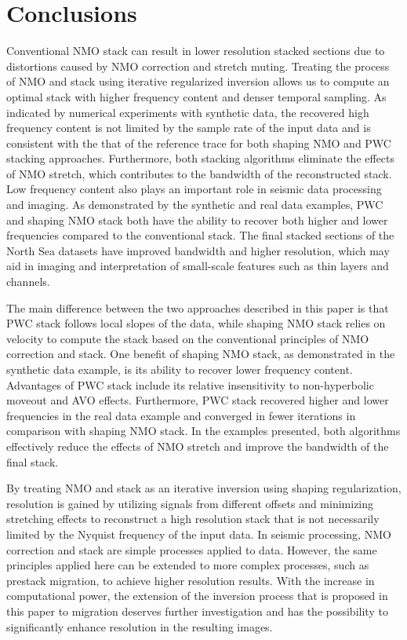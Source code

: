 
\section{Conclusions}
Conventional NMO stack can result in lower resolution stacked sections due to distortions caused by NMO correction and stretch
muting. Treating the process of NMO and stack using iterative regularized inversion allows us to compute an optimal stack with
higher frequency content and denser temporal sampling. As indicated by numerical experiments with synthetic data, 
the recovered high frequency content is not limited
by the sample rate of the input data and is consistent with the that of the reference trace for both shaping NMO and PWC stacking
approaches. Furthermore, both stacking algorithms eliminate the effects of NMO stretch, which contributes to the 
bandwidth of the reconstructed stack. Low frequency content also plays an important role in seismic data processing and imaging. As
demonstrated by the synthetic and real data examples, PWC and shaping NMO stack both have the ability to recover both higher and
lower frequencies compared to the conventional stack. The final stacked sections of the North Sea datasets have improved bandwidth and higher 
resolution, which may aid in imaging and interpretation of small-scale features such as thin layers and channels. 

The main difference between the two approaches described in this paper is that PWC stack follows local slopes of the data, while
shaping NMO stack relies on velocity to compute the stack based on the conventional principles of NMO correction and stack.
One benefit of shaping NMO stack, as demonstrated in the synthetic data example, is its ability to recover lower frequency content. 
Advantages of PWC stack include its relative insensitivity to non-hyperbolic moveout and AVO effects. Furthermore,
PWC stack recovered higher and lower frequencies in the real data example and converged in fewer iterations in comparison with shaping NMO stack.
In the examples presented, both algorithms effectively reduce the effects of NMO stretch and improve the bandwidth of the
final stack.

By treating NMO and stack
as an iterative inversion using shaping regularization, resolution is gained by utilizing signals from different offsets and
minimizing stretching effects to reconstruct a high resolution stack that is not necessarily limited by the Nyquist
frequency of the input data. In seismic processing, NMO correction and stack are simple processes applied to data. However,
the same principles applied here can be extended to more complex processes, such as prestack migration, to achieve higher
resolution results. With the increase in computational power, the extension of the inversion process that is proposed 
in this paper to migration deserves further investigation and has the possibility to significantly enhance
resolution in the resulting images.

